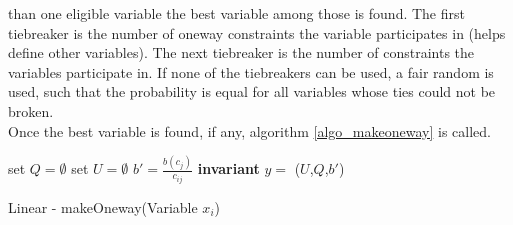 than one eligible variable the best variable among those is found. The first tiebreaker is the number of oneway 
constraints the variable participates in (helps define other variables). The next tiebreaker is the number of 
constraints the variables participate in. If none of the tiebreakers can be used, a fair random is used, such that the 
probability is equal for all variables whose ties could not be broken. \\ 
Once the best variable is found, if any, algorithm \ref{algo_makeoneway} \makeOneway is called. \\
\IncMargin{1em}
\begin{algorithm}[H]
\algdata
{}
\BlankLine
set $Q = \emptyset$ 
set $U = \emptyset$ 
\int $b' = \frac{b(c_j)}{c_{ij}}$ \; 
\textbf{invariant} $y = $ \Sum($U$,$Q$,$b'$)\; 

 \caption{Linear - makeOneway(\textsf{Variable} $x_i$)} \label{algo_makeoneway}
\end{algorithm}\DecMargin{1em} \noindent
